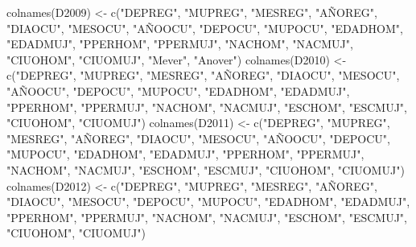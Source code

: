 \documentclass[
]{article}
\newenvironment{Shaded}{\begin{snugshade}}{\end{snugshade}}
\newcommand{\FunctionTok}[1]{\textcolor[rgb]{0.00,0.00,0.00}{#1}}
\newcommand{\NormalTok}[1]{#1}
\newcommand{\OtherTok}[1]{\textcolor[rgb]{0.56,0.35,0.01}{#1}}
\newcommand{\StringTok}[1]{\textcolor[rgb]{0.31,0.60,0.02}{#1}}
\begin{document}
\begin{Shaded}
\begin{Highlighting}[]
\FunctionTok{colnames}\NormalTok{(D2009) }\OtherTok{\textless{}{-}} \FunctionTok{c}\NormalTok{(}\StringTok{"DEPREG"}\NormalTok{, }\StringTok{"MUPREG"}\NormalTok{, }\StringTok{"MESREG"}\NormalTok{, }\StringTok{"AÑOREG"}\NormalTok{, }\StringTok{"DIAOCU"}\NormalTok{, }\StringTok{"MESOCU"}\NormalTok{, }\StringTok{"AÑOOCU"}\NormalTok{, }\StringTok{"DEPOCU"}\NormalTok{, }\StringTok{"MUPOCU"}\NormalTok{, }\StringTok{"EDADHOM"}\NormalTok{, }\StringTok{"EDADMUJ"}\NormalTok{, }\StringTok{"PPERHOM"}\NormalTok{, }\StringTok{"PPERMUJ"}\NormalTok{, }\StringTok{"NACHOM"}\NormalTok{, }\StringTok{"NACMUJ"}\NormalTok{, }\StringTok{"CIUOHOM"}\NormalTok{, }\StringTok{"CIUOMUJ"}\NormalTok{, }\StringTok{"Mever"}\NormalTok{, }\StringTok{"Anover"}\NormalTok{)}
\FunctionTok{colnames}\NormalTok{(D2010) }\OtherTok{\textless{}{-}} \FunctionTok{c}\NormalTok{(}\StringTok{"DEPREG"}\NormalTok{, }\StringTok{"MUPREG"}\NormalTok{, }\StringTok{"MESREG"}\NormalTok{, }\StringTok{"AÑOREG"}\NormalTok{, }\StringTok{"DIAOCU"}\NormalTok{, }\StringTok{"MESOCU"}\NormalTok{, }\StringTok{"AÑOOCU"}\NormalTok{, }\StringTok{"DEPOCU"}\NormalTok{, }\StringTok{"MUPOCU"}\NormalTok{, }\StringTok{"EDADHOM"}\NormalTok{, }\StringTok{"EDADMUJ"}\NormalTok{, }\StringTok{"PPERHOM"}\NormalTok{, }\StringTok{"PPERMUJ"}\NormalTok{, }\StringTok{"NACHOM"}\NormalTok{, }\StringTok{"NACMUJ"}\NormalTok{, }\StringTok{"ESCHOM"}\NormalTok{, }\StringTok{"ESCMUJ"}\NormalTok{, }\StringTok{"CIUOHOM"}\NormalTok{, }\StringTok{"CIUOMUJ"}\NormalTok{)}
\FunctionTok{colnames}\NormalTok{(D2011) }\OtherTok{\textless{}{-}} \FunctionTok{c}\NormalTok{(}\StringTok{"DEPREG"}\NormalTok{, }\StringTok{"MUPREG"}\NormalTok{, }\StringTok{"MESREG"}\NormalTok{, }\StringTok{"AÑOREG"}\NormalTok{, }\StringTok{"DIAOCU"}\NormalTok{, }\StringTok{"MESOCU"}\NormalTok{, }\StringTok{"AÑOOCU"}\NormalTok{, }\StringTok{"DEPOCU"}\NormalTok{, }\StringTok{"MUPOCU"}\NormalTok{, }\StringTok{"EDADHOM"}\NormalTok{, }\StringTok{"EDADMUJ"}\NormalTok{, }\StringTok{"PPERHOM"}\NormalTok{, }\StringTok{"PPERMUJ"}\NormalTok{, }\StringTok{"NACHOM"}\NormalTok{, }\StringTok{"NACMUJ"}\NormalTok{, }\StringTok{"ESCHOM"}\NormalTok{, }\StringTok{"ESCMUJ"}\NormalTok{, }\StringTok{"CIUOHOM"}\NormalTok{, }\StringTok{"CIUOMUJ"}\NormalTok{)}
\FunctionTok{colnames}\NormalTok{(D2012) }\OtherTok{\textless{}{-}} \FunctionTok{c}\NormalTok{(}\StringTok{"DEPREG"}\NormalTok{,  }\StringTok{"MUPREG"}\NormalTok{,  }\StringTok{"MESREG"}\NormalTok{,  }\StringTok{"AÑOREG"}\NormalTok{,  }\StringTok{"DIAOCU"}\NormalTok{,  }\StringTok{"MESOCU"}\NormalTok{,  }\StringTok{"DEPOCU"}\NormalTok{,  }\StringTok{"MUPOCU"}\NormalTok{, }\StringTok{"EDADHOM"}\NormalTok{, }\StringTok{"EDADMUJ"}\NormalTok{, }\StringTok{"PPERHOM"}\NormalTok{,  }\StringTok{"PPERMUJ"}\NormalTok{,  }\StringTok{"NACHOM"}\NormalTok{,  }\StringTok{"NACMUJ"}\NormalTok{,  }\StringTok{"ESCHOM"}\NormalTok{,  }\StringTok{"ESCMUJ"}\NormalTok{, }\StringTok{"CIUOHOM"}\NormalTok{,  }\StringTok{"CIUOMUJ"}\NormalTok{) }

\end{Highlighting}
\end{Shaded}
\end{document}
